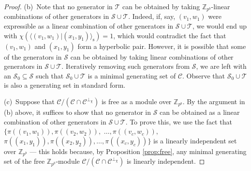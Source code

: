 \documentclass{article}
\theoremstyle{remark}
\theoremstyle{definition}
\numberwithin{equation}{section}
\begin{document}
\begin{proof}
(b)\ Note that no generator in $\mathcal{T}$ can be obtained by taking $\mathbb{Z}_{p^b}$-linear combinations of other generators   in $\mathcal{S} \cup \mathcal{T}$. Indeed, if, say, $(v_1,w_1)$ were expressible as a linear combination of other generators in $\mathcal{S} \cup \mathcal{T}$, we would end up with $\chi(\langle (v_1,w_1) | (x_1,y_1) \rangle_{\mathrm{s}}) = 1$, which would contradict the fact that $(v_1,w_1)$ and $(x_1,y_1)$ form a hyperbolic pair. However, it is possible that some of the generators in $\mathcal{S}$ can be obtained by taking linear combinations of other generators in $\mathcal{S} \cup \mathcal{T}$. Iteratively removing such generators from $\mathcal{S}$,  we are left with an $\mathcal{S}_0 \subseteq \mathcal{S}$ such that $\mathcal{S}_0 \cup \mathcal{T}$ is a minimal generating set of $\mathcal{C}$. Observe that $\mathcal{S}_0 \cup \mathcal{T}$ is also a generating set in standard form.

(c)\ Suppose that $\mathcal{C}/(\mathcal{C} \cap \mathcal{C}^{\perp_\chi})$ is free as a module over $\mathbb{Z}_{p^b}$. By the argument in (b) above, it suffices to show that no generator in $\mathcal{S}$ can be obtained as a linear combination of other generators in $\mathcal{S} \cup \mathcal{T}$. To prove this, we use the fact that $\{\pi((v_1,w_1)),\pi((v_2,w_2)),$ $\ldots, \pi((v_{c},w_{c})),$ $\pi((x_1,y_1)),\pi((x_2,y_2)),\ldots, \pi((x_{c},y_{c}))\}$ is a linearly independent set over $\mathbb{Z}_{p^b}$ --- this holds because, by Proposition \ref{prop:free},  any minimal generating set of the free $\mathbb{Z}_{p^b}$-module $\mathcal{C}/(\mathcal{C} \cap \mathcal{C}^{\perp_\chi})$ is linearly independent.



\end{proof}
\end{document}
